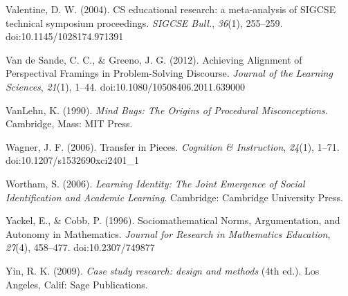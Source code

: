 Valentine, D. W. (2004). CS educational research: a meta-analysis of
SIGCSE technical symposium proceedings. \emph{SIGCSE Bull.},
\emph{36}(1), 255--259. doi:10.1145/1028174.971391

Van de Sande, C. C., \& Greeno, J. G. (2012). Achieving Alignment of
Perspectival Framings in Problem-Solving Discourse. \emph{Journal of the
Learning Sciences}, \emph{21}(1), 1--44.
doi:10.1080/10508406.2011.639000

VanLehn, K. (1990). \emph{Mind Bugs: The Origins of Procedural
Misconceptions}. Cambridge, Mass: MIT Press.

Wagner, J. F. (2006). Transfer in Pieces. \emph{Cognition \&
Instruction}, \emph{24}(1), 1--71. doi:10.1207/s1532690xci2401\_1

Wortham, S. (2006). \emph{Learning Identity: The Joint Emergence of
Social Identification and Academic Learning}. Cambridge: Cambridge
University Press.

Yackel, E., \& Cobb, P. (1996). Sociomathematical Norms, Argumentation,
and Autonomy in Mathematics. \emph{Journal for Research in Mathematics
Education}, \emph{27}(4), 458--477. doi:10.2307/749877

Yin, R. K. (2009). \emph{Case study research: design and methods} (4th
ed.). Los Angeles, Calif: Sage Publications.
